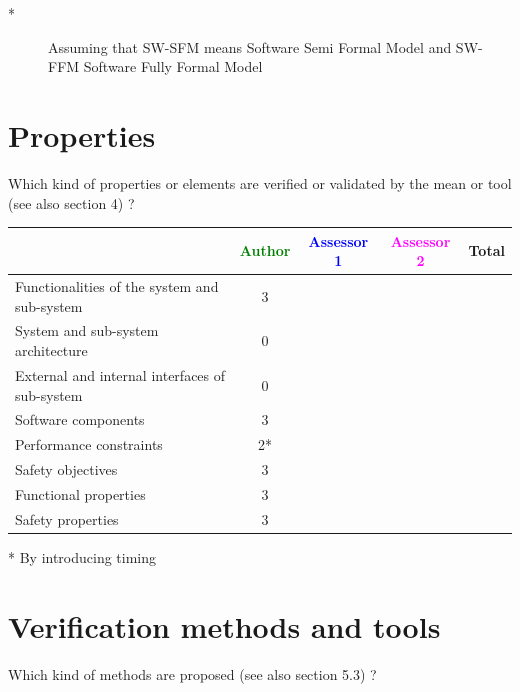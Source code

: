 \begin{author_comment}
\begin{description}
\item[*] Assuming that SW-SFM means Software Semi Formal Model and SW-FFM Software Fully Formal Model
\end{description}
\end{author_comment}

\section{Properties}

Which kind of properties or elements are verified or validated by the mean or tool (see also \citep{D4.1} section 4)  ?



\begin{tabular}{|l | c | c | c | c|}
\hline
& \textcolor{green}{Author} & \textcolor{blue}{Assessor 1} & \textcolor{magenta}{Assessor 2} & Total \\
\hline 
Functionalities of the system and sub-system & 3& & &  \\
\hline
System and sub-system architecture & 0& & &  \\
\hline
External and internal interfaces of sub-system & 0& & &  \\
\hline
Software components & 3& & &  \\
\hline
Performance constraints & 2*& & &  \\
\hline
Safety objectives & 3& & &  \\
\hline
Functional properties & 3& & &  \\
\hline
Safety properties & 3& & &  \\
\hline
\end{tabular}

\begin{author_comment}
 * By introducing timing
\end{author_comment}


\section{Verification methods and tools}

Which kind of methods are proposed (see also \citep{D4.1} section 5.3) ?



